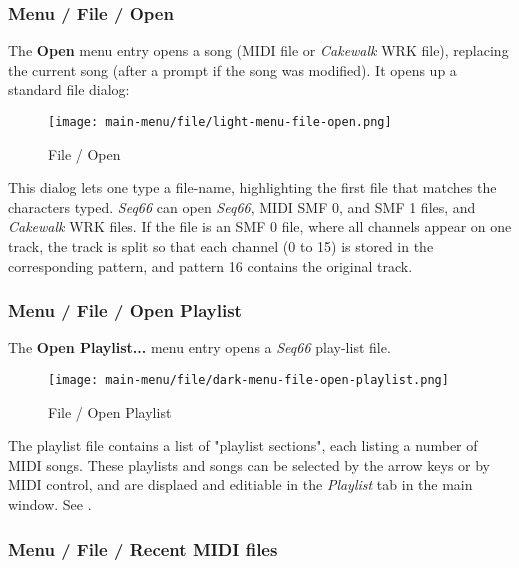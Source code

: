 \subsubsection{Menu / File / Open}
\label{subsubsec:menu_file_open}

   The \textbf{Open} menu entry opens a song (MIDI file or \textsl{Cakewalk}
   WRK file), replacing the current song (after a prompt if the song was
   modified).
   It opens up a standard file dialog:

\begin{figure}[H]
   \centering 
   \texttt{[image: main-menu/file/light-menu-file-open.png]}
   \caption{File / Open}
   \label{fig:menu_file_open}
\end{figure}

   This dialog lets one type a file-name, highlighting the first file
   that matches the characters typed.
   \textsl{Seq66} can open \textsl{Seq66}, MIDI SMF 0, and SMF 1 files, and
   \textsl{Cakewalk} WRK files.
   If the file is an SMF 0 file, where all channels appear on one track, the
   track is split so that each channel (0 to 15) is stored in the corresponding
   pattern, and pattern 16 contains the original track.

\subsubsection{Menu / File / Open Playlist}
\label{subsubsec:menu_file_open_playlist}

   The \textbf{Open Playlist...} menu entry opens a \textsl{Seq66}
   play-list file.

\begin{figure}[H]
   \centering 
   \texttt{[image: main-menu/file/dark-menu-file-open-playlist.png]}
   \caption{File / Open Playlist}
   \label{fig:menu_file_open_playlist}
\end{figure}

   The playlist file contains a list of "playlist sections",
   each listing a number of MIDI songs.
   These playlists and songs can be
   selected by the arrow keys or by MIDI control,
   and are displaed and editiable in the \textsl{Playlist} tab
   in the main window.
   See .

\subsubsection{Menu / File / Recent MIDI files}
\label{subsubsec:menu_file_recent}

